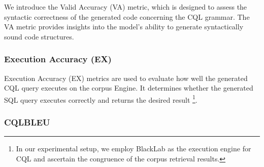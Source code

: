 \documentclass[11pt]{article}
\begin{document}
\begin{CJK*}{UTF8}{gbsn}
We introduce the Valid Accuracy (VA) metric, which is designed to assess the syntactic correctness of the generated code concerning the CQL grammar. The VA metric provides insights into the model's ability to generate syntactically sound code structures.

\subsubsection{Execution Accuracy (EX)}
Execution Accuracy (EX) metrics are used to evaluate how well the generated CQL query executes on the corpus Engine. It determines whether the generated SQL query executes correctly and returns the desired result \footnote{In our experimental setup, we employ BlackLab as the execution engine for CQL and ascertain the congruence of the corpus retrieval results.}.

\subsubsection{CQLBLEU}


\end{CJK*}
\end{document}
